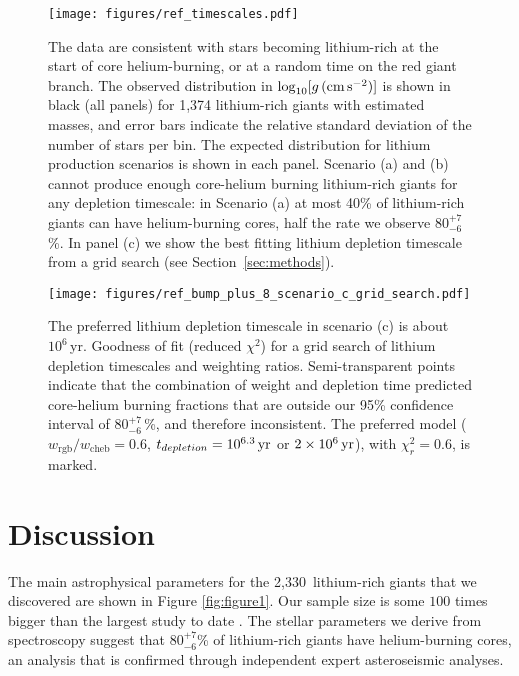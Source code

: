 \documentclass[twocolumn]{aastex62}
\newcommand{\SampleSize}{2,330}
\newcommand{\logg}{\log_{10}[g\,({\rm cm\,s}^{-2})]}
\begin{document}
\begin{figure*}[t!]
	\texttt{[image: figures/ref\_timescales.pdf]}
	\caption{{The data are consistent with stars becoming lithium-rich at the start of core helium-burning, or at a random time on the red giant branch.} The observed distribution in $\logg$ is shown in black (all panels) for 1,374 lithium-rich giants with estimated masses, and error bars indicate the relative standard deviation of the number of stars per bin. The expected distribution for lithium production scenarios is shown in each panel. Scenario (a) and (b) cannot produce enough core-helium burning lithium-rich giants for any depletion timescale: in Scenario (a) at most 40\% of lithium-rich giants can have helium-burning cores, half the rate we observe $80^{+7}_{-6}$\,\%. In panel (c) we show the best fitting lithium depletion timescale from a grid search (see Section~\ref{sec:methods}).}
	\label{fig:evtracks}
\end{figure*}



\begin{figure}
	\texttt{[image: figures/ref\_bump\_plus\_8\_scenario\_c\_grid\_search.pdf]}
	\caption{The preferred  lithium depletion timescale in scenario (c) is about $10^6$\,yr. Goodness of fit (reduced $\chi^2$) for a grid search of lithium depletion timescales and weighting ratios. Semi-transparent points indicate that the combination of weight and depletion time predicted core-helium burning fractions that are outside our 95\% confidence interval of $80^{+7}_{-6}$\,\%, and therefore inconsistent.  The preferred model ($w_\mathrm{rgb}/w_\mathrm{cheb} = 0.6$, $t_{depletion} = 10^{6.3}\,{\rm yr}$ or $2\times10^6\,{\rm yr}$), with $\chi_r^2 = 0.6$, is marked.}
	\label{fig:grid_search}
\end{figure}



\section{Discussion} \label{sec:discussion}

The main astrophysical parameters for the \SampleSize\ lithium-rich giants
that we discovered are shown in Figure \ref{fig:figure1}.  Our sample size
is some $100$ times bigger than the largest study to date \citep{Martell_2013}.
The stellar parameters we derive from spectroscopy suggest that $80^{+7}_{-6}$\% of lithium-rich 
giants have helium-burning cores, an analysis that is confirmed through independent expert
asteroseismic analyses. 
\end{document}

